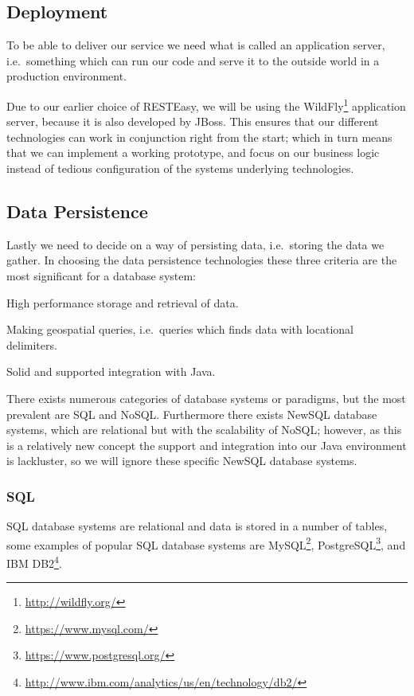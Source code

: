 \subsection{Deployment}
To be able to deliver our service we need what is called an application server, i.e.~something which can run our code and serve it to the outside world in a production environment.

Due to our earlier choice of RESTEasy, we will be using the WildFly\footnote{\url{http://wildfly.org/}} application server, because it is also developed by JBoss.
This ensures that our different technologies can work in conjunction right from the start;
which in turn means that we can implement a working prototype, and focus on our business logic instead of tedious configuration of the systems underlying technologies.

\subsection{Data Persistence}\label{subsec:datapersistence}
Lastly we need to decide on a way of persisting data, i.e.~storing the data we gather.
In choosing the data persistence technologies these three criteria are the most significant for a database system:
\begin{eletterate}
    \item High performance storage and retrieval of data.
    \item Making geospatial queries, i.e.~queries which finds data with locational delimiters.
    \item Solid and supported integration with Java.
\end{eletterate}


\bigskip
There exists numerous categories of database systems or paradigms, but the most prevalent are SQL and NoSQL.
Furthermore there exists NewSQL database systems, which are relational but with the scalability of NoSQL;
however, as this is a relatively new concept the support and integration into our Java environment is lackluster, so we will ignore these specific NewSQL database systems.

\subsubsection*{SQL}

SQL database systems are relational and data is stored in a number of tables, some examples of popular SQL database systems are MySQL\footnote{\url{https://www.mysql.com/}}, PostgreSQL\footnote{\url{https://www.postgresql.org/}}, and IBM DB2\footnote{\url{http://www.ibm.com/analytics/us/en/technology/db2/}}.\cite{DB_RANKINGS}

